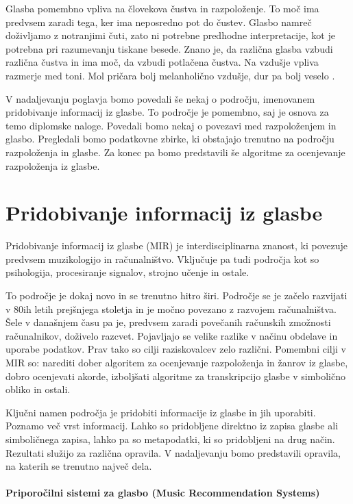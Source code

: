 \documentclass[a4paper, 12pt]{book}
\begin{document}
{Glasba pomembno vpliva na človekova čustva in razpoloženje. To moč ima predvsem zaradi tega, ker ima neposredno pot do čustev. Glasbo namreč do\-živ\-lja\-mo z notranjimi čuti, zato ni potrebne predhodne interpretacije, kot je potrebna pri razumevanju tiskane besede.  Znano je, da različna glasba vzbudi različna čustva in ima moč, da vzbudi potlačena čustva. Na vzdušje vpliva razmerje med toni. Mol pričara bolj melanholično vzdušje, dur pa bolj veselo \cite{lenko2009pomen}.

V nadaljevanju poglavja bomo povedali še nekaj o področju, imenovanem pridobivanje informacij iz glasbe. To področje je pomembno, saj je osnova za temo diplomske naloge. Povedali bomo nekaj o povezavi med razpoloženjem in glasbo. Pregledali bomo podatkovne zbirke, ki obstajajo trenutno na področju razpoloženja in glasbe. Za konec pa bomo predstavili še algoritme za ocenjevanje razpoloženja iz glasbe. 

\section{Pridobivanje informacij iz glasbe}

Pridobivanje informacij iz glasbe (MIR) je interdisciplinarna znanost, ki povezuje predvsem muzikologijo in računalništvo\cite{pesek2012prepoznavanje}. Vključuje pa tudi področja kot so psihologija, procesiranje signalov, strojno učenje in ostale. 

To področje je dokaj novo in se trenutno hitro širi. Področje se je začelo razvijati v 80ih letih prejšnjega stoletja in je močno povezano z razvojem računalništva. Šele v današnjem času pa je, predvsem zaradi povečanih računskih zmožnosti računalnikov, doživelo razcvet. Pojavljajo se velike razlike v načinu obdelave in uporabe podatkov. Prav tako so cilji raziskovalcev zelo različni. Pomembni cilji v MIR so: narediti dober algoritem za ocenjevanje razpoloženja in žanrov iz glasbe, dobro ocenjevati akorde, izboljšati algoritme za transkripcijo glasbe v simbolično obliko in ostali. 

Ključni namen področja je pridobiti informacije iz glasbe in jih uporabiti. Poznamo več vrst informacij. Lahko so pridobljene direktno iz zapisa glasbe ali simboličnega zapisa, lahko pa so metapodatki, ki so pridobljeni na drug način. Rezultati služijo za različna opravila. V nadaljevanju bomo predstavili opravila, na katerih se trenutno največ dela.

\paragraph{Priporočilni sistemi za glasbo (Music Recommendation Systems)}

}
\end{document}
